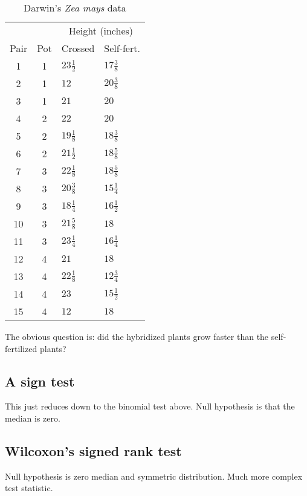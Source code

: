 \begin{table}
\centering
\renewcommand{\arraystretch}{1.2}
\begin{tabular}{ccll}
\toprule
& & \multicolumn{2}{c}{Height (inches)} \\
\cmidrule{3-4}
Pair & Pot & Crossed & Self-fert. \\
\midrule
1 & 1 & $23 \tfrac{1}{2}$ & $17 \tfrac{3}{8}$ \\
2 & 1 & $12$ & $20 \tfrac{3}{8}$ \\
3 & 1 & $21$ & $20$ \\[1.0ex]
4 & 2 & $22$ & $20$ \\
5 & 2 & $19 \tfrac{1}{8}$ & $18 \tfrac{3}{8}$ \\
6 & 2 & $21 \tfrac{1}{2}$ & $18 \tfrac{5}{8}$ \\[1.0ex]
7 & 3 & $22 \tfrac{1}{8}$ & $18 \tfrac{5}{8}$ \\
8 & 3 & $20 \tfrac{3}{8}$ & $15 \tfrac{1}{4}$ \\
9 & 3 & $18 \tfrac{1}{4}$ & $16 \tfrac{1}{2}$ \\
10 & 3 & $21 \tfrac{5}{8}$ & $18$ \\
11 & 3 & $23 \tfrac{1}{4}$ & $16 \tfrac{1}{4}$ \\[1.0ex]
12 & 4 & $21$ & $18$ \\
13 & 4 & $22 \tfrac{1}{8}$ & $12 \tfrac{3}{4}$ \\
14 & 4 & $23$ & $15 \tfrac{1}{2}$ \\
15 & 4 & $12$ & $18$ \\
\bottomrule
\end{tabular}
\caption{Darwin's \textit{Zea mays} data}
\label{table:darwin}
\end{table}

The obvious question is: did the hybridized plants grow faster than the self-fertilized plants?

\subsection{A sign test}

This just reduces down to the binomial test above. Null hypothesis is that the median is zero.

\subsection{Wilcoxon's signed rank test}

Null hypothesis is zero median and symmetric distribution. Much more complex test statistic.

